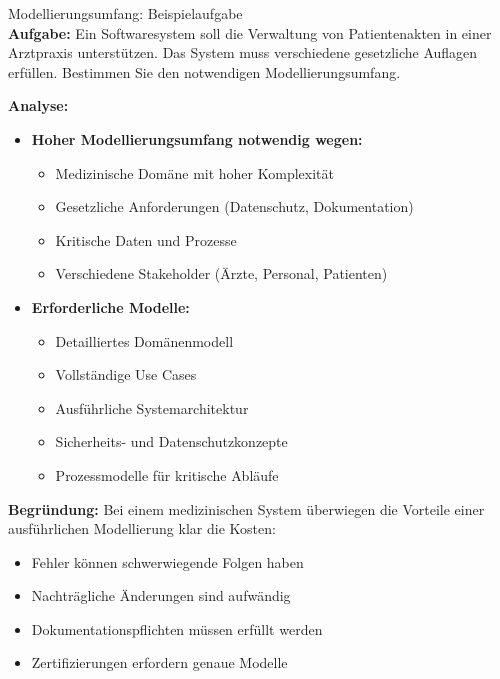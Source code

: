 \begin{example2}{Modellierungsumfang: Beispielaufgabe}\\
\textbf{Aufgabe:} Ein Softwaresystem soll die Verwaltung von Patientenakten in einer Arztpraxis unterstützen. Das System muss verschiedene gesetzliche Auflagen erfüllen. Bestimmen Sie den notwendigen Modellierungsumfang.

\textbf{Analyse:}
\begin{itemize}
    \item \textbf{Hoher Modellierungsumfang notwendig wegen:}
    \begin{itemize}
        \item Medizinische Domäne mit hoher Komplexität
        \item Gesetzliche Anforderungen (Datenschutz, Dokumentation)
        \item Kritische Daten und Prozesse
        \item Verschiedene Stakeholder (Ärzte, Personal, Patienten)
    \end{itemize}
    
    \item \textbf{Erforderliche Modelle:}
    \begin{itemize}
        \item Detailliertes Domänenmodell
        \item Vollständige Use Cases
        \item Ausführliche Systemarchitektur
        \item Sicherheits- und Datenschutzkonzepte
        \item Prozessmodelle für kritische Abläufe
    \end{itemize}
\end{itemize}

\textbf{Begründung:}
Bei einem medizinischen System überwiegen die Vorteile einer ausführlichen Modellierung klar die Kosten:
\begin{itemize}
    \item Fehler können schwerwiegende Folgen haben
    \item Nachträgliche Änderungen sind aufwändig
    \item Dokumentationspflichten müssen erfüllt werden
    \item Zertifizierungen erfordern genaue Modelle
\end{itemize}
\end{example2}

